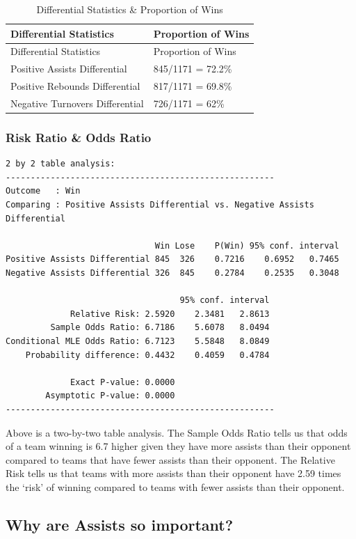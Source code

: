 \documentclass[]{book}
\begin{document}
\begin{longtable}[]{@{}ll@{}}
\caption{Differential Statistics \& Proportion of Wins}\tabularnewline
\toprule
Differential Statistics & Proportion of Wins\tabularnewline
\midrule
\endfirsthead
\toprule
Differential Statistics & Proportion of Wins\tabularnewline
\midrule
\endhead
Positive Assists Differential & 845/1171 = 72.2\%\tabularnewline
Positive Rebounds Differential & 817/1171 = 69.8\%\tabularnewline
Negative Turnovers Differential & 726/1171 = 62\%\tabularnewline
\bottomrule
\end{longtable}

\hypertarget{risk-ratio-odds-ratio}{%
\subsubsection{Risk Ratio \& Odds Ratio}\label{risk-ratio-odds-ratio}}

\begin{verbatim}
2 by 2 table analysis: 
------------------------------------------------------ 
Outcome   : Win 
Comparing : Positive Assists Differential vs. Negative Assists Differential 

                              Win Lose    P(Win) 95% conf. interval
Positive Assists Differential 845  326    0.7216    0.6952   0.7465
Negative Assists Differential 326  845    0.2784    0.2535   0.3048

                                   95% conf. interval
             Relative Risk: 2.5920    2.3481   2.8613
         Sample Odds Ratio: 6.7186    5.6078   8.0494
Conditional MLE Odds Ratio: 6.7123    5.5848   8.0849
    Probability difference: 0.4432    0.4059   0.4784

             Exact P-value: 0.0000 
        Asymptotic P-value: 0.0000 
------------------------------------------------------
\end{verbatim}

Above is a two-by-two table analysis. The Sample Odds Ratio tells us that odds of a team winning is 6.7 higher given they have more assists than their opponent compared to teams that have fewer assists than their opponent. The Relative Risk tells us that teams with more assists than their opponent have 2.59 times the `risk' of winning compared to teams with fewer assists than their opponent.

\hypertarget{why-are-assists-so-important}{%
\subsection{Why are Assists so important?}\label{why-are-assists-so-important}}
\end{document}
